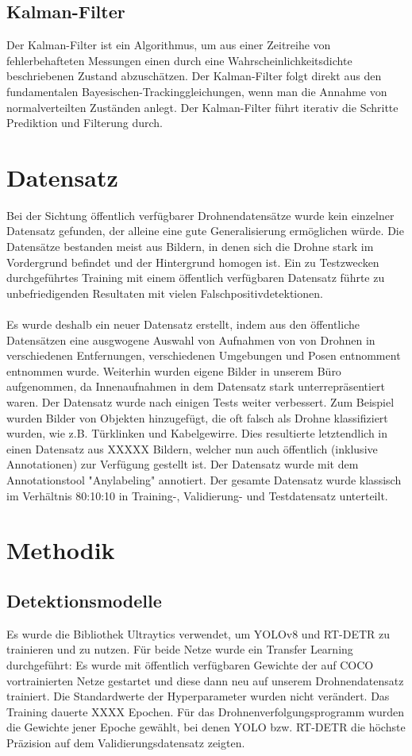 \documentclass[runningheads]{llncs}
\begin{document}
\subsection{Kalman-Filter}
Der Kalman-Filter ist ein Algorithmus, um aus einer Zeitreihe von fehlerbehafteten Messungen einen durch eine Wahrscheinlichkeitsdichte beschriebenen Zustand abzuschätzen. Der Kalman-Filter folgt direkt aus den fundamentalen Bayesischen-Trackinggleichungen, wenn man die Annahme von normalverteilten Zuständen anlegt. Der Kalman-Filter führt iterativ die Schritte Prediktion und Filterung durch.

\section{Datensatz}
Bei der Sichtung öffentlich verfügbarer Drohnendatensätze wurde kein einzelner Datensatz gefunden, der alleine eine gute Generalisierung ermöglichen würde. Die Datensätze bestanden meist aus Bildern, in denen sich die Drohne stark im Vordergrund befindet und der Hintergrund homogen ist. Ein zu Testzwecken durchgeführtes Training mit einem öffentlich verfügbaren Datensatz führte zu unbefriedigenden Resultaten mit vielen Falschpositivdetektionen.\\\\
Es wurde deshalb ein neuer Datensatz erstellt, indem aus den öffentliche Datensätzen eine ausgwogene Auswahl von Aufnahmen von von Drohnen in verschiedenen Entfernungen, verschiedenen Umgebungen und Posen entnomment entnommen wurde. Weiterhin wurden eigene Bilder in unserem Büro aufgenommen, da Innenaufnahmen in dem Datensatz stark unterrepräsentiert waren. Der Datensatz wurde nach einigen Tests weiter verbessert. Zum Beispiel wurden Bilder von Objekten hinzugefügt, die oft falsch als Drohne klassifiziert wurden, wie z.B. Türklinken und Kabelgewirre. Dies resultierte letztendlich in einen Datensatz aus XXXXX Bildern, welcher nun auch öffentlich (inklusive Annotationen) zur Verfügung gestellt ist. Der Datensatz wurde mit dem Annotationstool "Anylabeling" annotiert. Der gesamte Datensatz wurde klassisch im Verhältnis 80:10:10 in Training-, Validierung- und Testdatensatz unterteilt.

\section{Methodik}
\subsection{Detektionsmodelle}
Es wurde die Bibliothek Ultraytics verwendet, um YOLOv8 und RT-DETR zu trainieren und zu nutzen. Für beide Netze wurde ein Transfer Learning durchgeführt: Es wurde mit öffentlich verfügbaren Gewichte der auf COCO vortrainierten Netze gestartet und diese dann neu auf unserem Drohnendatensatz trainiert. Die Standardwerte der Hyperparameter wurden nicht verändert. Das Training dauerte XXXX Epochen. Für das Drohnenverfolgungsprogramm wurden die Gewichte jener Epoche gewählt, bei denen YOLO bzw. RT-DETR die höchste Präzision auf dem Validierungsdatensatz zeigten.\\\\
\end{document}
